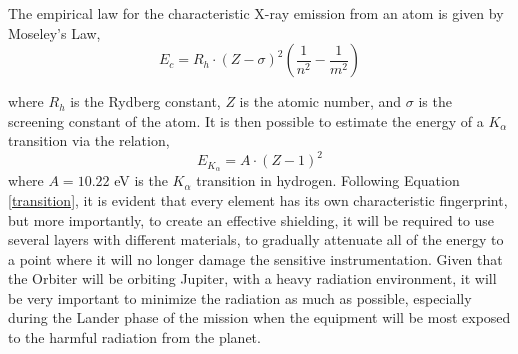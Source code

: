 The empirical law for the characteristic X-ray emission from an atom is given by Moseley's Law,\\
\begin{equation}
E_c= R_h \cdot (Z-\sigma)^2 \left(\frac{1}{n^2} - \frac{1}{m^2}\right)\label{moseley:eq}
\end{equation}

where $R_h$ is the Rydberg constant, $Z$ is the atomic number, and $\sigma$ is the screening constant of the atom. It is then possible to estimate the energy of a $K_\alpha$ transition via the relation,\\
\begin{equation}
E_{K_\alpha} = A \cdot (Z-1)^2 \label{transition}
\end{equation}
where $A = 10.22$ eV is the $K_\alpha$ transition in hydrogen. Following Equation \ref{transition}, it is evident that every element has its own characteristic fingerprint, but more importantly, to create an effective shielding, it will be required to use several layers with different materials, to gradually attenuate all of the energy to a point where it will no longer damage the sensitive instrumentation. Given that the Orbiter will be orbiting Jupiter, with a heavy radiation environment, it will be very important to minimize the radiation as much as possible, especially during the Lander phase of the mission when the equipment will be most exposed to the harmful radiation from the planet.


%
%
%
%
%
%    
%
